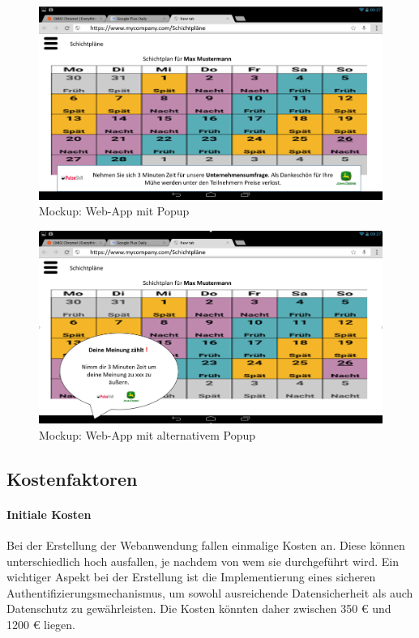\begin{figure}[H] 
\centering 
\includegraphics[scale=0.3]{images/lunchapp_mockups/mockup3} 
\caption[Mockup: Web-App mit Popup]{Mockup: Web-App mit Popup} 
\label{wamu2} 
\end{figure}

\begin{figure}[H] 
\centering 
\includegraphics[scale=0.3]{images/lunchapp_mockups/mockup2} 
\caption[Mockup: Web-App mit alternativem Popup]{Mockup: Web-App mit alternativem Popup} 
\label{wamu2} 
\end{figure}



\subsection{Kostenfaktoren}

\paragraph{Initiale Kosten}
Bei der Erstellung der Webanwendung fallen einmalige Kosten an. Diese können unterschiedlich hoch ausfallen, je nachdem von wem sie durchgeführt wird. Ein wichtiger Aspekt bei der Erstellung ist die Implementierung eines sicheren Authentifizierungsmechanismus, um sowohl ausreichende Datensicherheit als auch Datenschutz zu gewährleisten. Die Kosten könnten daher zwischen 350 € und 1200 € liegen.

